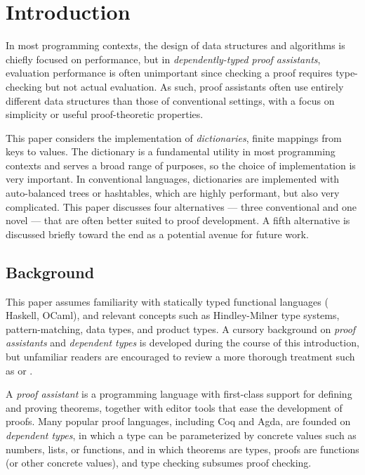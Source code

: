 \section{Introduction}
\label{sec:Introduction}

\newcommand{\firstUseGoal}[1]
  {\textbf{\emph{#1}}}


In most programming contexts, the design of data structures and algorithms is chiefly focused on performance, but in \emph{dependently-typed proof assistants}, evaluation performance is often unimportant since checking a proof requires type-checking but not actual evaluation.
%
As such, proof assistants often use entirely different data structures than those of conventional settings, with a focus on simplicity or useful proof-theoretic properties.

This paper considers the implementation of \emph{dictionaries}, \ie{} finite mappings from keys to values.
%
The dictionary is a fundamental utility in most programming contexts and serves a broad range of purposes, so the choice of implementation is very important.
%
In conventional languages, dictionaries are implemented with auto-balanced trees or hashtables, which are highly performant, but also very complicated.
%
This paper discusses four alternatives --- three conventional and one novel --- that are often better suited to proof development.
%
A fifth alternative is discussed briefly toward the end as a potential avenue for future work.

\subsection{Background}

This paper assumes familiarity with statically typed functional languages (\eg{} Haskell, OCaml), and relevant concepts such as Hindley-Milner type systems, pattern-matching, data types, and product types.
%
A cursory background on \emph{proof assistants} and \emph{dependent types} is developed during the course of this introduction, but unfamiliar readers are encouraged to review a more thorough treatment such as \citep{plfa} or \citep{Pierce:SF1}.

A \emph{proof assistant} is a programming language with first-class support for defining and proving theorems, together with editor tools that ease the development of proofs.
%
Many popular proof languages, including Coq and Agda, are founded on \emph{dependent types}, in which a type can be parameterized by concrete values such as numbers, lists, or functions,
%
and in which theorems are types, proofs are functions (or other concrete values), and type checking subsumes proof checking.

